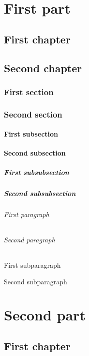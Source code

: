 \documentclass[nocopyright,baselinegrid]{uit-thesis-test}
\begin{document}
\frontmatter
\tableofcontents

\mainmatter

\part{First part}
\chapter{First chapter}
\chapter{Second chapter}
\section{First section}
\section{Second section}
\subsection{First subsection}
\subsection{Second subsection}
\subsubsection{First subsubsection}
\subsubsection{Second subsubsection}
\paragraph{First paragraph}
\paragraph{Second paragraph}
\subparagraph{First subparagraph}
\subparagraph{Second subparagraph}

\part{Second part}
\chapter{First chapter}
\end{document}
